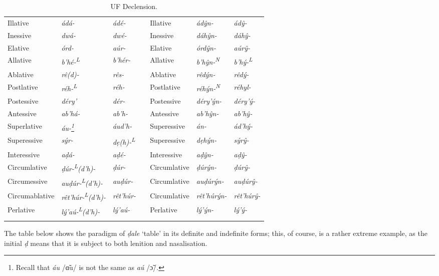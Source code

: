\documentclass[a4paper, 12pt, twoside, openright, final]{book}
\def \L {\textsuperscript{L}}
\def \N {\textsuperscript{N}}
\let \w \textit
\begin{document}
\begin{longtable}{l|>{\it}l|>{\it}lll|>{\it}l|>{\it}l}
Illative        & ádá-           & ádé-     && Illative      & ádŷn-        & ádŷ-     \\
Inessive        & dwá-           & dwé-     && Inessive      & dáhŷn-       & dáhŷ-    \\
Elative         & órd-           & aúr-     && Elative       & órdŷn-       & aúrŷ-    \\
Allative        & b’hé-\L        & b’hér-   && Allative      & b’hŷn-\N     & b’hý-\L  \\
Ablative        & rê(d)-         & rês-     && Ablative      & rêdýn-       & rêdý-    \\
Postlative      & réh-\L         & réh-     && Postlative    & réhýn-\N     & réhyl-   \\ %
Postessive      & déry’          & dér-     && Postessive    & déry’ýn-     & déry’ý-  \\
Antessive       & ab’há-         & ab’h-    && Antessive     & ab’hŷn-      & ab’hŷ-   \\ %
Superlative     & áu-\footnote{Recall that \w{áu} /ɑ̃u/ is not the same as \w{aú} /ɔ̃/.}
                & áud’h-   && Superessive   & án-          & ád’hý-   \\ %
Superessive     & sýr-           & dẹ(h)-\L && Superessive   & dẹhýn-       & sýrŷ-    \\
Interessive     & aḍá-           & aḍé-     && Interessive   & aḍŷn-        & aḍŷ-     \\
Circumlative    & ḍúr-\L(d’h)-   & ḍúr-     && Circumlative  & ḍúrýn-       & ḍúrŷ-    \\ %
Circumessive    & auḍúr-\L(d’h)- & auḍúr-   && Circumlative  & auḍúrýn-     & auḍúrŷ-  \\ %
Circumablative  & rêt’húr-\L(d’h)- & rêt’húr- && Circumlative  & rêt’húrýn- & rêt’húrŷ- \\ %
Perlative       & lý’aú-\L(d’h)- & lý’aú-   && Perlative     & lý’ýn-       & lý’ý-    \\ %
\noalign{\medskip}
\caption{UF Declension.}\label{tab:table-uf-declension}
\end{longtable}

\noindent The table below shows the paradigm of \w{ḍale} ‘table’ in its definite and indefinite forms; this, of course,
is a rather extreme example, as the initial \w{ḍ} means that it is subject to both lenition and nasalisation.
\end{document}
